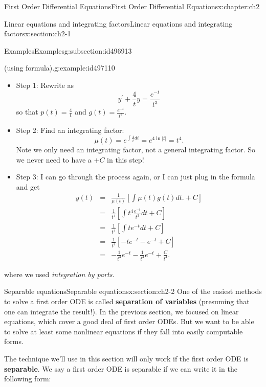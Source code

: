 \documentclass[oneside,10pt,]{book}
\newcommand{\terminology}[1]{\textbf{#1}}
\numberwithin{equation}{section}
\numberwithin{equation}{section}
\newcommand{\amp}{&}
\begin{document}
\begin{chapterptx}{First Order Differential Equations}{}{First Order Differential Equations}{}{}{x:chapter:ch2}
\begin{sectionptx}{Linear equations and integrating factors}{}{Linear equations and integrating factors}{}{}{x:section:ch2-1}
\begin{subsectionptx}{Examples}{}{Examples}{}{}{g:subsection:id496913}
\begin{example}{(using formula).}{g:example:id497110}
%
%
\begin{itemize}[label=\textbullet]
\item{}Step 1: Rewrite as%
\begin{equation*}
y^{\prime}+\frac{4}{t}y=\frac{e^{-t}}{t^{3}}
\end{equation*}
so that \(p(t)=\frac{4}{t}\) and \(g(t)=\frac{e^{-t}}{t^{3}}\).%
\item{}Step 2: Find an integrating factor:%
\begin{equation*}
\mu(t)=e^{\int\frac{4}{t}dt}=e^{4\ln\left|t\right|}=t^{4}.
\end{equation*}
Note we only need an integrating factor, not a general integrating factor. So we never need to have a \(+C\) in this step!%
\item{}Step 3: I can go through the process again, or I can just plug in the formula and get%
\begin{align*}
y(t) \amp = \amp \frac{1}{\mu(t)}\left[\int\mu(t)g(t)dt.+C\right]\\
\amp = \amp \frac{1}{t^{4}}\left[\int t^{4}\frac{e^{-t}}{t^{3}}dt+C\right]\\
\amp = \amp \frac{1}{t^{4}}\left[\int te^{-t}dt+C\right]\\
\amp = \amp \frac{1}{t^{4}}\left[-te^{-t}-e^{-t}+C\right]\\
\amp = \amp -\frac{1}{t^{3}}e^{-t}-\frac{1}{t^{4}}e^{-t}+\frac{C}{t^{4}}.
\end{align*}
%
\end{itemize}
 where we used \emph{integration by parts}.\end{example}
\end{subsectionptx}
\end{sectionptx}
%
%
\typeout{************************************************}
\typeout{************************************************}
%
\begin{sectionptx}{Separable equations}{}{Separable equations}{}{}{x:section:ch2-2}
One of the easiest methods to solve a first order ODE is called \terminology{separation of variables} (presuming that one can integrate the result!). In the previous section, we focused on linear equations, which cover a good deal of first order ODEs. But we want to be able to solve at least some nonlinear equations if they fall into easily computable forms.%
\par
The technique we'll use in this section will only work if the first order ODE is \terminology{separable}. We say a first order ODE is separable if we can write it in the following form:%

\end{sectionptx}
\end{chapterptx}
\end{document}
